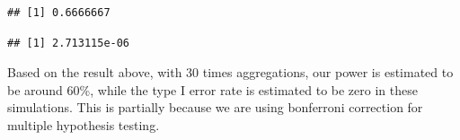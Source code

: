 \documentclass[
]{article}
\newenvironment{Shaded}{\begin{snugshade}}{\end{snugshade}}
\newcommand{\CommentTok}[1]{\textcolor[rgb]{0.56,0.35,0.01}{\textit{#1}}}
\newcommand{\DataTypeTok}[1]{\textcolor[rgb]{0.13,0.29,0.53}{#1}}
\newcommand{\DecValTok}[1]{\textcolor[rgb]{0.00,0.00,0.81}{#1}}
\newcommand{\FloatTok}[1]{\textcolor[rgb]{0.00,0.00,0.81}{#1}}
\newcommand{\KeywordTok}[1]{\textcolor[rgb]{0.13,0.29,0.53}{\textbf{#1}}}
\newcommand{\NormalTok}[1]{#1}
\newcommand{\OperatorTok}[1]{\textcolor[rgb]{0.81,0.36,0.00}{\textbf{#1}}}
\newcommand{\StringTok}[1]{\textcolor[rgb]{0.31,0.60,0.02}{#1}}
\begin{document}
\begin{Shaded}
\end{Shaded}

\begin{verbatim}
## [1] 0.6666667
\end{verbatim}

\begin{Shaded}
\end{Shaded}

\begin{verbatim}
## [1] 2.713115e-06
\end{verbatim}

Based on the result above, with 30 times aggregations, our power is
estimated to be around 60\%, while the type I error rate is estimated to
be zero in these simulations. This is partially because we are using
bonferroni correction for multiple hypothesis testing.
\end{document}
